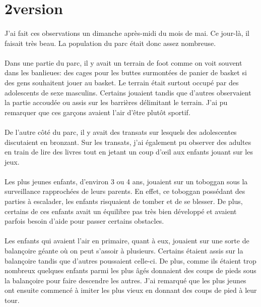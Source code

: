 \section{2\ieme version}

\paragraph{} J'ai fait ces observations un dimanche après-midi du mois de mai.
Ce jour-là, il faisait très beau. La population du parc était donc assez
nombreuse.

\paragraph{} Dans une partie du parc, il y avait un terrain de foot comme on
voit souvent dans les banlieues: des cages pour les buttes surmontées de panier
de basket si des gens souhaitent jouer au basket. Le terrain était surtout
occupé par des adolescents de sexe masculins. Certains jouaient tandis que
d'autres observaient la partie accoudée ou assis sur les barrières délimitant
le terrain. J'ai pu remarquer que ces garçons avaient l'air d'être plutôt
sportif.

\paragraph{} De l'autre côté du parc, il y avait des transats sur lesquels des
adolescentes discutaient en bronzant. Sur les transats, j'ai également pu
observer des adultes en train de lire des livres tout en jetant un coup d'œil
aux enfants jouant sur les jeux.

\paragraph{} Les plus jeunes enfants, d'environ 3 ou 4 ans, jouaient sur un
toboggan sous la surveillance rapprochées de leurs parents. En effet, ce
toboggan possédant des parties à escalader, les enfants risquaient de tomber et
de se blesser. De plus, certains de ces enfants avait un équilibre pas très
bien développé et avaient parfois besoin d'aide pour passer certains obstacles.

\paragraph{} Les enfants qui avaient l'air en primaire, quant à eux, jouaient
sur une sorte de balançoire géante où on peut s'assoir à plusieurs. Certains
étaient assis sur la balançoire tandis que d'autres poussaient celle-ci. De
plus, comme ils étaient trop nombreux quelques enfants parmi les plus âgés
donnaient des coups de pieds sous la balançoire pour faire descendre les
autres. J'ai remarqué que les plus jeunes ont ensuite commencé à imiter les
plus vieux en donnant des coups de pied à leur tour.

